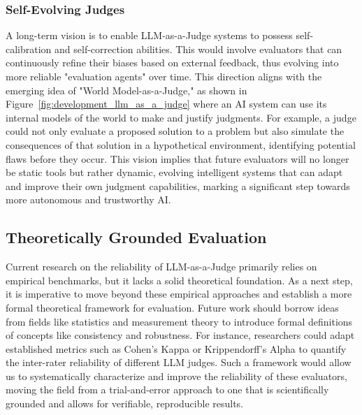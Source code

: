 \subsubsection{\textbf{Self-Evolving Judges}}\label{subsec:future_self_evolving}

A long-term vision is to enable LLM-as-a-Judge systems to possess self-calibration and self-correction abilities. This would involve evaluators that can continuously refine their biases based on external feedback, thus evolving into more reliable "evaluation agents" over time. This direction aligns with the emerging idea of "World Model-as-a-Judge," as shown in Figure~\ref{fig:development_llm_as_a_judge} where an AI system can use its internal models of the world to make and justify judgments. For example, a judge could not only evaluate a proposed solution to a problem but also simulate the consequences of that solution in a hypothetical environment, identifying potential flaws before they occur. This vision implies that future evaluators will no longer be static tools but rather dynamic, evolving intelligent systems that can adapt and improve their own judgment capabilities, marking a significant step towards more autonomous and trustworthy AI.

\subsection{Theoretically Grounded Evaluation}\label{subsec:future_theoretically}

Current research on the reliability of LLM-as-a-Judge primarily relies on empirical benchmarks, but it lacks a solid theoretical foundation. As a next step, it is imperative to move beyond these empirical approaches and establish a more formal theoretical framework for evaluation. Future work should borrow ideas from fields like statistics and measurement theory to introduce formal definitions of concepts like consistency and robustness. For instance, researchers could adapt established metrics such as Cohen's Kappa or Krippendorff's Alpha to quantify the inter-rater reliability of different LLM judges. Such a framework would allow us to systematically characterize and improve the reliability of these evaluators, moving the field from a trial-and-error approach to one that is scientifically grounded and allows for verifiable, reproducible results.















